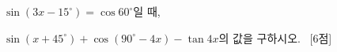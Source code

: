 $\sin(3x-15^\circ)=\cos 60^\circ$일 때,\par\noindent $\sin(x+45^\circ)+\cos(90^\circ-4x)-\tan 4x$의 값을 구하시오. ~\mbox{\mbox{[6점]}}
